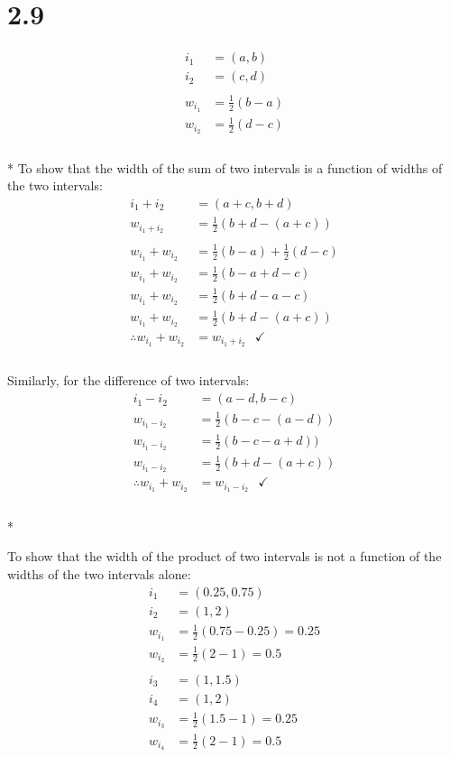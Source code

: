 \documentclass{report}
\newcommand{\?}{\stackrel{?}{=}}
\newcommand{\<}{\stackrel{?}{<}}
\begin{document}
\section*{2.9}

\begin{align}
i_1 &= (a, b)\\
i_2 &= (c, d)\\
\\
w_{i_1} &= \frac{1}{2}(b-a)\\
w_{i_2} &= \frac{1}{2}(d-c)\\
\end{align}\\*
To show that the width of the sum of two intervals is a function of widths of the two intervals:
\begin{align}
i_1+i_2 &= (a+c, b+d)\\
w_{i_1+i_2} &= \frac{1}{2}(b+d - (a+c))\\
\\
w_{i_1} + w_{i_2} &= \frac{1}{2}(b-a) + \frac{1}{2}(d-c)\\
w_{i_1} + w_{i_2} &= \frac{1}{2}(b-a + d-c)\\
w_{i_1} + w_{i_2} &= \frac{1}{2}(b + d - a -c)\\
w_{i_1} + w_{i_2} &= \frac{1}{2}(b+ d -(a+c))\\
\therefore w_{i_1} + w_{i_2} &= w_{i_1+i_2} \:\:\; \checkmark\\
\end{align}\\
Similarly, for the difference of two intervals:
\begin{align}
i_1-i_2 &= (a-d, b-c)\\
w_{i_1-i_2} &= \frac{1}{2}(b-c - (a-d))\\
w_{i_1-i_2} &= \frac{1}{2}(b-c - a+d))\\
w_{i_1-i_2} &= \frac{1}{2}(b+d - (a+c))\\
\therefore w_{i_1} + w_{i_2} &= w_{i_1-i_2} \:\:\; \checkmark\\
\end{align}\\*
\pagebreak

To show that the width of the product of two intervals is not a function of the widths of the two intervals alone:
\begin{align}
i_1 &= (0.25, 0.75)\\
i_2 &= (1, 2)\\
w_{i_1} &= \frac{1}{2}(0.75-0.25) = 0.25\\
w_{i_2} &= \frac{1}{2}(2-1)=0.5\\
\\
i_3 &= (1, 1.5)\\
i_4 &= (1, 2)\\
w_{i_3} &= \frac{1}{2}(1.5-1) = 0.25\\
w_{i_4} &= \frac{1}{2}(2-1)=0.5\\
\end{align}
\end{document}
